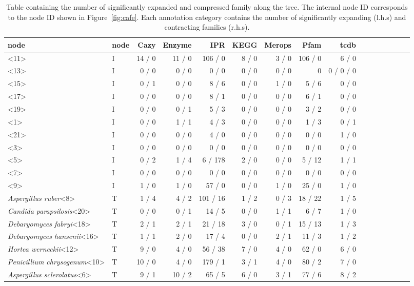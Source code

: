 \documentclass[jof,article,submit,moreauthors,pdftex,10pt,a4paper]{Definitions/mdpi}
\newcommand{\horWer}{\textit{Hortea werneckii}}
\newcommand{\aspRub}{\textit{Aspergillus ruber}}
\newcommand{\penChr}{\textit{Penicillium chrysogenum}}
\newcommand{\debFab}{\textit{Debaryomyces fabryi}}
\newcommand{\debHan}{\textit{Debaryomyces hansenii}}
\newcommand{\canPar}{\textit{Candida parapsilosis}}
\newcommand{\phiScl}{\textit{Aspergillus sclerolatus}}
\begin{document}
\begin{table}[htbp]
\caption{\label{tab:cafe}
Table containing the number of significantly expanded and compressed family along the tree. The internal node ID corresponds to the node ID shown in Figure~\ref{fig:cafe}. Each annotation category contains the number of significantly expanding (l.h.s) and contracting families (r.h.s).}
\centering
\small
\begin{tabular}{llrrrrrrrrrrrrrr}

node & node & Cazy & Enzyme & IPR &  KEGG & Merops & Pfam & tcdb\\
\hline
<11> & I & 14 / 0 & 11 / 0 & 106 / 0 & 8 / 0 & 3 / 0 & 106 / 0 & 6 / 0\\
<13> & I & 0 / 0 & 0 / 0 & 0 / 0 & 0 / 0 & 0 / 0 & 0 & 0 / 0 / 0\\
<15> & I & 0 / 1 & 0 / 0 & 8 / 6 & 0 / 0 & 1 / 0 & 5 / 6 & 0 / 0\\
<17> & I & 0 / 0 & 0 / 0 & 8 / 1 & 0 / 0 & 0 / 0 & 6 / 1 & 0 / 0\\
<19> & I & 0 / 0 & 0 / 1 & 5 / 3 & 0 / 0 & 0 / 0 & 3 / 2 & 0 / 0\\
<1> & I & 0 / 0 & 1 / 1 & 4 / 3 & 0 / 0 & 0 / 0 & 1 / 3 & 0 / 1\\
<21> & I & 0 / 0 & 0 / 0 & 4 / 0 & 0 / 0 & 0 / 0 & 0 / 0 & 1 / 0\\
<3> & I & 0 / 0 & 0 / 0 & 0 / 0 & 0 / 0 & 0 / 0 & 0 / 0 & 0 / 0\\
<5> & I & 0 / 2 & 1 / 4 & 6 / 178 & 2 / 0 & 0 / 0 & 5 / 12 & 1 / 1\\
<7> & I & 0 / 0 & 0 / 0 & 0 / 0 & 0 / 0 & 0 / 0 & 0 / 0 & 0 / 0\\
<9> & I & 1 / 0 & 1 / 0 & 57 / 0 & 0 / 0 & 1 / 0 & 25 / 0 & 1 / 0\\
\aspRub<8> & T & 1 / 4 & 4 / 2 & 101 / 16 & 1 / 2 & 0 / 3 & 18 / 22 & 1 / 5\\
\canPar<20> & T & 0 / 0 & 0 / 1 & 14 / 5 & 0 / 0 & 1 / 1 & 6 / 7 & 1 / 0\\
\debFab<18> & T & 2 / 1 & 2 / 1 & 21 / 18 & 3 / 0 & 0 / 1 & 15 / 13 & 1 / 3\\
\debHan<16> & T & 1 / 1 & 2 / 0 & 17 / 4 & 0 / 0 & 2 / 1 & 11 / 3 & 1 / 2\\
\horWer<12> & T & 9 / 0 & 4 / 0 & 56 / 38 & 7 / 0 & 4 / 0 & 62 / 0 & 6 / 0\\
\penChr<10> & T & 10 / 0 & 4 / 0 & 179 / 1 & 3 / 1 & 4 / 0 & 80 / 2 & 7 / 0\\
\phiScl<6> & T & 9 / 1 & 10 / 2 & 65 / 5 & 6 / 0 & 3 / 1 & 77 / 6 & 8 / 2\\

\end{tabular}
\end{table}
\end{document}
